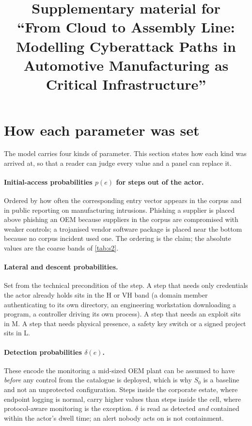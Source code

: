 \documentclass[10pt,a4paper]{article}
\title{Supplementary material for\\ ``From Cloud to Assembly Line: Modelling Cyberattack
Paths in Automotive Manufacturing as Critical Infrastructure''}
\date{}
\author{}
\begin{document}
\maketitle

\section{How each parameter was set}

The model carries four kinds of parameter. This section states how each kind was
arrived at, so that a reader can judge every value and a panel can replace it.

\paragraph{Initial-access probabilities $p(e)$ for steps out of the actor.}
Ordered by how often the corresponding entry vector appears in the corpus and in
public reporting on manufacturing intrusions. Phishing a supplier is placed
above phishing an OEM because suppliers in the corpus are compromised with
weaker controls; a trojanised vendor software package is placed near the bottom
because no corpus incident used one. The ordering is the claim; the absolute
values are the coarse bands of \autoref{tab:s2}.

\paragraph{Lateral and descent probabilities.} Set from the technical
precondition of the step. A step that needs only credentials the actor already
holds sits in the H or VH band (a domain member authenticating to its own
directory, an engineering workstation downloading a program, a controller
driving its own process). A step that needs an exploit sits in M. A step that
needs physical presence, a safety key switch or a signed project sits in L.

\paragraph{Detection probabilities $\delta(e)$.} These encode the monitoring a
mid-sized OEM plant can be assumed to have \emph{before} any control from the
catalogue is deployed, which is why $S_0$ is a baseline and not an unprotected
configuration. Steps inside the corporate estate, where endpoint logging is
normal, carry higher values than steps inside the cell, where protocol-aware
monitoring is the exception. $\delta$ is read as detected \emph{and} contained
within the actor's dwell time; an alert nobody acts on is not containment.
\end{document}
